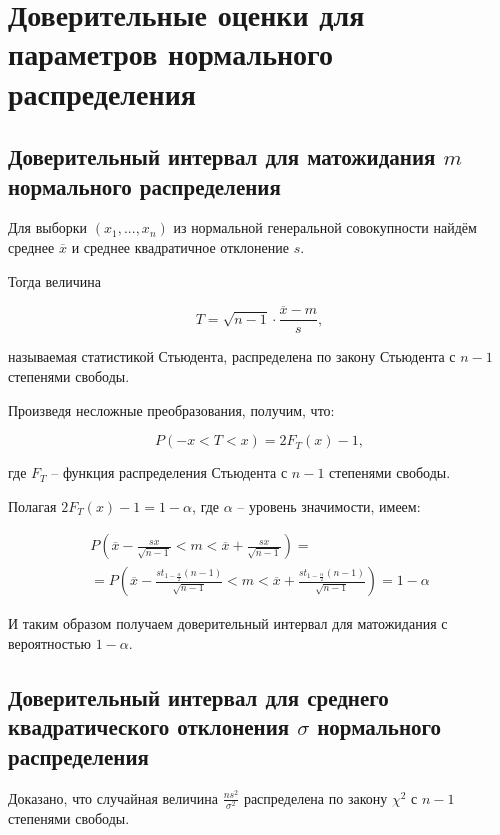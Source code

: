 \section{Доверительные оценки для параметров нормального распределения}

\subsection{Доверительный интервал для матожидания $m$ нормального распределения}

Для выборки $(x_1, ..., x_n)$ из нормальной генеральной совокупности найдём среднее $\overline{x}$ и среднее квадратичное отклонение $s$.

Тогда величина 

\begin{equation}
	T = \sqrt{n - 1} \cdot \frac{\overline{x} - m}{s},
\end{equation}

называемая статистикой Стьюдента, распределена по закону Стьюдента с $n-1$ степенями свободы.

Произведя несложные преобразования, получим, что:

\begin{equation}
P \left( -x < T < x \right) = 2F_T(x) - 1,
\end{equation}

где $F_T$ -- функция распределения Стьюдента с $n-1$ степенями свободы.

Полагая $2F_T(x) - 1 = 1 - \alpha$, где $\alpha$ -- уровень значимости, имеем:

\begin{multline}
\displaystyle P \left( \overline{x} - \frac{sx}{\sqrt{n-1}} < m < \overline{x} + \frac{sx}{\sqrt{n-1}} \right) = \\
= P \left( \overline{x} - \frac{st_{1 - \frac{\alpha}{2}}(n - 1)}{\sqrt{n-1}} < m < \overline{x} + \frac{st_{1 - \frac{\alpha}{2}}(n - 1)}{\sqrt{n-1}} \right) = 1 - \alpha
\end{multline}

И таким образом получаем доверительный интервал для матожидания с вероятностью $1 - \alpha$.

\subsection{Доверительный интервал для среднего квадратического отклонения $\sigma$ нормального распределения}

Доказано, что случайная величина $\frac{ns^2}{\sigma^2}$ распределена по закону $\chi^2$ с $n-1$ степенями свободы.

